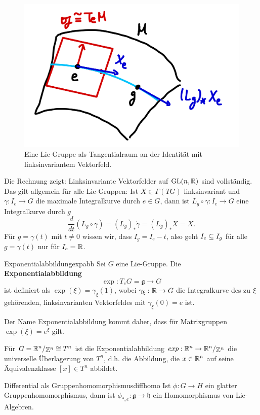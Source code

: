 \begin{figure}[H]
\label{fig:linksinvariant}
\centering
\includegraphics[width=0.3\linewidth]{Bilder/linksinvariant.png}
\caption{Eine Lie-Gruppe als Tangentialraum an der Identität mit linksinvariantem Vektorfeld.}
\end{figure}
\begin{bemerkung}
Die Rechnung zeigt: Linksinvariante Vektorfelder auf $\text{GL}(n, \mathbb{R})$ sind vollständig. Das gilt allgemein für alle Lie-Gruppen: Ist $X \in \Gamma (TG)$ linksinvariant und $\gamma: I_e \to G$ die maximale Integralkurve durch $e \in G$, dann ist $L_g \circ \gamma: I_e \to G$ eine Integralkurve durch $g$
\begin{equation}
\frac{d}{dt}(L_g \circ \gamma) = (L_g)_\ast \dot{\gamma} = (L_g)_\ast X = X.
\end{equation}
Für $g = \gamma(t)$ mit $t \neq 0$ wissen wir, dass $I_g = I_e -t$, also geht $I_e \subseteq I_g$ für alle $g = \gamma (t)$ nur für $I_e = \mathbb{R}$.
\end{bemerkung}
\begin{definition}{Exponentialabbildung}{expabb}
Sei $G$ eine Lie-Gruppe. Die \textbf{Exponentialabbildung}
\begin{equation}
\exp: T_eG = \mathfrak{g} \to G
\end{equation}
ist definiert als $\exp (\xi) = \gamma_\xi (1)$, wobei $\gamma_\xi: \mathbb{R} \to G$ die Integralkurve des zu $\xi$ gehörenden, linksinvarianten Vektorfeldes mit $\gamma_\xi (0)=e$ ist.
\end{definition}
\begin{bemerkung}
Der Name Exponentialabbildung kommt daher, dass für Matrixgruppen $\exp(\xi) = e^\xi$ gilt.
\end{bemerkung}
\begin{beispiel}
Für $G = \quotient{\R^n}{\Z^n} \cong T^n$ ist die Exponentialabbildung $exp: \R^n \to \quotient{\R^n}{\Z^n}$ die universelle Überlagerung von $T^n$, d.h. die Abbildung, die $x\in \mathbb{R}^n$ auf seine Äquivalenzklasse $[x] \in T^n$ abbildet.
\end{beispiel}
\begin{satz}{Differential als Gruppenhomomorphismus}{diffhomo}
Ist $\phi: G \to H$ ein glatter Gruppenhomomorphismus, dann ist $\phi_{\ast, e}: \mathfrak{g} \to \mathfrak{h}$ ein Homomorphismus von Lie-Algebren.
\end{satz}
